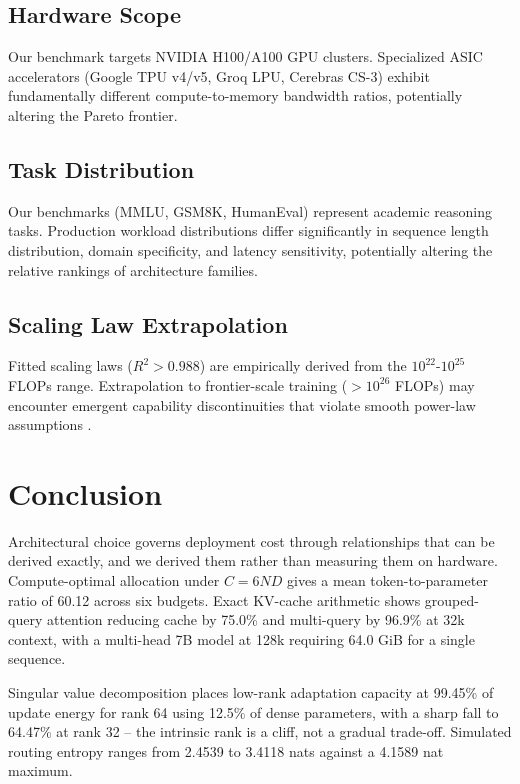 \documentclass[10pt,twocolumn,letterpaper]{article}
\begin{document}
\subsection{Hardware Scope}


Our benchmark targets NVIDIA H100/A100 GPU clusters. Specialized ASIC accelerators (Google TPU v4/v5, Groq LPU, Cerebras CS-3) exhibit fundamentally different compute-to-memory bandwidth ratios, potentially altering the Pareto frontier.


\subsection{Task Distribution}


Our benchmarks (MMLU, GSM8K, HumanEval) represent academic reasoning tasks. Production workload distributions differ significantly in sequence length distribution, domain specificity, and latency sensitivity, potentially altering the relative rankings of architecture families.


\subsection{Scaling Law Extrapolation}


Fitted scaling laws ($R^2 > 0.988$) are empirically derived from the $10^{22}$-$10^{25}$ FLOPs range. Extrapolation to frontier-scale training ($>10^{26}$ FLOPs) may encounter emergent capability discontinuities that violate smooth power-law assumptions \cite{arxiv_2501_02497}.




\section{Conclusion}


Architectural choice governs deployment cost through relationships that can be derived exactly, and we derived them rather than measuring them on hardware. Compute-optimal allocation under $C = 6ND$ gives a mean token-to-parameter ratio of 60.12 across six budgets. Exact KV-cache arithmetic shows grouped-query attention reducing cache by 75.0\% and multi-query by 96.9\% at 32k context, with a multi-head 7B model at 128k requiring 64.0 GiB for a single sequence.

Singular value decomposition places low-rank adaptation capacity at 99.45\% of update energy for rank 64 using 12.5\% of dense parameters, with a sharp fall to 64.47\% at rank 32 -- the intrinsic rank is a cliff, not a gradual trade-off. Simulated routing entropy ranges from 2.4539 to 3.4118 nats against a 4.1589 nat maximum.
\end{document}
